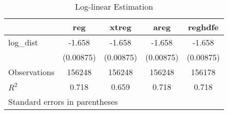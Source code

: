 \begin{table}[htbp]\centering
    \caption{Log-linear Estimation}
    \begin{tabular}{l*{4}{c}}
    \hline\hline
                        &\multicolumn{1}{c}{reg}&\multicolumn{1}{c}{xtreg}&\multicolumn{1}{c}{areg}&\multicolumn{1}{c}{reghdfe}\\
    \hline
    log\_dist            &      -1.658&      -1.658&      -1.658&      -1.658\\
                        &   (0.00875)&   (0.00875)&   (0.00875)&   (0.00875)\\
    \hline
    Observations        &      156248&      156248&      156248&      156178\\
    \(R^{2}\)           &       0.718&       0.659&       0.718&       0.718\\
    \hline\hline
    \multicolumn{5}{l}{\footnotesize Standard errors in parentheses}\\
    \end{tabular}
    \end{table}
    